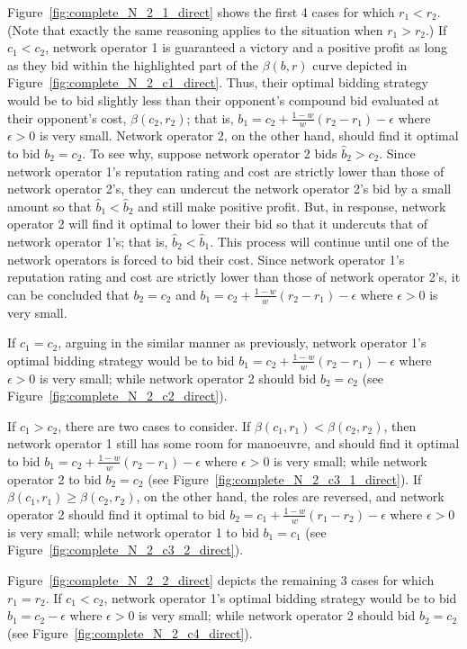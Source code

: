 Figure~\ref{fig:complete_N_2_1_direct} shows the first 4 cases for which $r_1 < r_2$. (Note that exactly the same reasoning applies to the situation when $r_1 > r_2$.) If $c_1 < c_2$, network operator 1 is guaranteed a victory and a positive profit as long as they bid within the highlighted part of the $\beta(b,r)$ curve depicted in Figure~\ref{fig:complete_N_2_c1_direct}. Thus, their optimal bidding strategy would be to bid slightly less than their opponent's compound bid evaluated at their opponent's cost, $\beta(c_2,r_2)$; that is, $b_1 = c_2 + \frac{1-w}{w}(r_2-r_1) - \epsilon$ where $\epsilon>0$ is very small. Network operator 2, on the other hand, should find it optimal to bid $b_2 = c_2$. To see why, suppose network operator 2 bids $\hat{b}_2>c_2$. Since network operator 1's reputation rating and cost are strictly lower than those of network operator 2's, they can undercut the network operator 2's bid by a small amount so that $\hat{b}_1 < \hat{b}_2$ and still make positive profit. But, in response, network operator 2 will find it optimal to lower their bid so that it undercuts that of network operator 1's; that is, $\hat{b}_2 < \hat{b}_1$. This process will continue until one of the network operators is forced to bid their cost. Since network operator 1's reputation rating and cost are strictly lower than those of network operator 2's, it can be concluded that $b_2 = c_2$ and $b_1 = c_2 + \frac{1-w}{w}(r_2-r_1) - \epsilon$ where $\epsilon>0$ is very small.

If $c_1 = c_2$, arguing in the similar manner as previously, network operator 1's optimal bidding strategy would be to bid $b_1 = c_2 + \frac{1-w}{w}(r_2-r_1) - \epsilon$ where $\epsilon>0$ is very small; while network operator 2 should bid $b_2 = c_2$ (see Figure~\ref{fig:complete_N_2_c2_direct}).

If $c_1 > c_2$, there are two cases to consider. If $\beta(c_1,r_1)<\beta(c_2,r_2)$, then network operator 1 still has some room for manoeuvre, and should find it optimal to bid $b_1 = c_2 + \frac{1-w}{w}(r_2-r_1) - \epsilon$ where $\epsilon>0$ is very small; while network operator 2 to bid $b_2=c_2$ (see Figure~\ref{fig:complete_N_2_c3_1_direct}). If $\beta(c_1,r_1)\ge \beta(c_2,r_2)$, on the other hand, the roles are reversed, and network operator 2 should find it optimal to bid $b_2 = c_1 + \frac{1-w}{w}(r_1-r_2) - \epsilon$ where $\epsilon>0$ is very small; while network operator 1 to bid $b_1 = c_1$ (see Figure~\ref{fig:complete_N_2_c3_2_direct}).

Figure~\ref{fig:complete_N_2_2_direct} depicts the remaining 3 cases for which $r_1=r_2$. If $c_1 < c_2$, network operator 1's optimal bidding strategy would be to bid $b_1 = c_2 - \epsilon$ where $\epsilon>0$ is very small; while network operator 2 should bid $b_2 = c_2$ (see Figure~\ref{fig:complete_N_2_c4_direct}).

